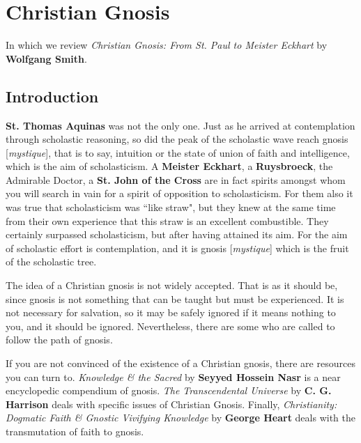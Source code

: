 \section{Christian Gnosis}
\label{sec:ChristianGnosis}

In which we review \emph{Christian Gnosis: From St. Paul to Meister Eckhart} by \textbf{Wolfgang Smith}.

\subsection{Introduction}

\begin{quotex}
\textbf{St. Thomas Aquinas} was not the only one. Just as he arrived at contemplation through scholastic reasoning, so did the peak of the scholastic wave reach gnosis [\emph{mystique}], that is to say, intuition or the state of union of faith and intelligence, which is the aim of scholasticism. A \textbf{Meister Eckhart}, a \textbf{Ruysbroeck}, the Admirable Doctor, a \textbf{St. John of the Cross} are in fact spirits amongst whom you will search in vain for a spirit of opposition to scholasticism. For them also it was true that scholasticism was ``like straw", but they knew at the same time from their own experience that this straw is an excellent combustible. They certainly surpassed scholasticism, but after having attained its aim. For the aim of scholastic effort is contemplation, and it is gnosis [\emph{mystique}] which is the fruit of the scholastic tree. 

\end{quotex}
The idea of a Christian gnosis is not widely accepted. That is as it should be, since gnosis is not something that can be taught but must be experienced. It is not necessary for salvation, so it may be safely ignored if it means nothing to you, and it should be ignored. Nevertheless, there are some who are called to follow the path of gnosis.

If you are not convinced of the existence of a Christian gnosis, there are resources you can turn to. \emph{Knowledge \& the Sacred} by \textbf{Seyyed Hossein Nasr} is a near encyclopedic compendium of gnosis. \emph{The Transcendental Universe} by \textbf{C. G. Harrison} deals with specific issues of Christian Gnosis. Finally, \emph{Christianity: Dogmatic Faith \& Gnostic Vivifying Knowledge} by \textbf{George Heart} deals with the transmutation of faith to gnosis.

